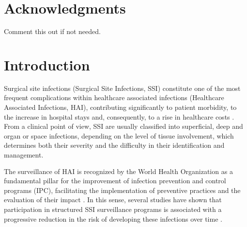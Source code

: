 \documentclass[12pt,onecolumn]{article}
\date{June 2024}
\begin{document}



\clearpage{\pagestyle{empty}\cleardoublepage}
\setcounter{page}{1}
\pagestyle{fancy}

\begin{abstract}
How do I write a great abstract? Well, \href{https://www.aje.com/arc/make-great-first-impression-6-tips-writing-strong-abstract/?utm_term=&utm_campaign=AJE_Digital_Prosp_Display_EN&utm_source=adwords&utm_medium=ppc&hsa_acc=3768250728&hsa_cam=20934774130&hsa_grp=&hsa_ad=&hsa_src=x&hsa_tgt=&hsa_kw=&hsa_mt=&hsa_net=adwords&hsa_ver=3&gad_source=1&gclid=Cj0KCQjwncWvBhD_ARIsAEb2HW8VmH5upvCl-7VY_ZjuMa-adcPmbd3JwVzV3cyFXgkIjFxoJpRIYhoaAnutEALw_wcB}{here} you will find some useful tips.

\end{abstract}

\clearpage
\section*{Acknowledgments}
Comment this out if not needed.

\clearpage{\pagestyle{empty}}

\tableofcontents 
\clearpage{\pagestyle{empty}}
\setcounter{page}{1}
\fancyhead[LE,RO]{\slshape \rightmark}
\fancyhead[LO,RE]{\slshape \leftmark}


\section{Introduction}


Surgical site infections (Surgical Site Infections, SSI) constitute one of the most frequent complications within healthcare associated infections (Healthcare Associated Infections, HAI), contributing significantly to patient morbidity, to the increase in hospital stays and, consequently, to a rise in healthcare costs \cite{1_intro_morbidity}. From a clinical point of view, SSI are usually classified into superficial, deep and organ or space infections, depending on the level of tissue involvement, which determines both their severity and the difficulty in their identification and management.

The surveillance of HAI is recognized by the World Health Organization as a fundamental pillar for the improvement of infection prevention and control programs (IPC), facilitating the implementation of preventive practices and the evaluation of their impact \cite{2_intro_prevention}. In this sense, several studies have shown that participation in structured SSI surveillance programs is associated with a progressive reduction in the risk of developing these infections over time \cite{3_intro_decrease_risk}.
\end{document}
